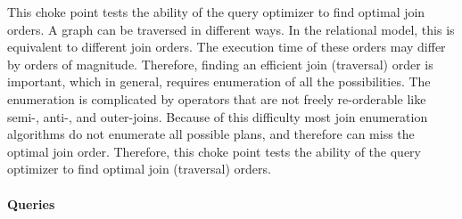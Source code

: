 
This choke point tests the ability of the query optimizer to find optimal join
orders. A graph can be traversed in different ways. In the relational model,
this is equivalent to different join orders. The execution time of these orders
may differ by orders of magnitude. Therefore, finding an efficient join
(traversal) order is important, which in general, requires enumeration of all
the possibilities. The enumeration is complicated by operators that are not
freely re-orderable like semi-, \mbox{anti-,} and outer-joins. Because of this
difficulty most join enumeration algorithms do not enumerate all possible plans,
and therefore can miss the optimal join order. Therefore, this choke point tests
the ability of the query optimizer to find optimal join (traversal) orders.


\paragraph{Queries}
{\raggedright
}
